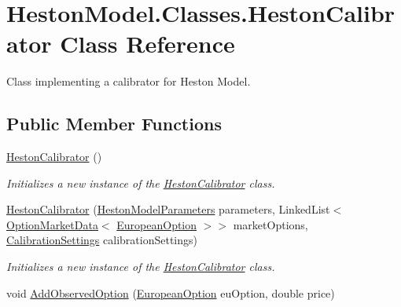 \hypertarget{class_heston_model_1_1_classes_1_1_heston_calibrator}{}\section{Heston\+Model.\+Classes.\+Heston\+Calibrator Class Reference}
\label{class_heston_model_1_1_classes_1_1_heston_calibrator}


Class implementing a calibrator for Heston Model.  


\subsection*{Public Member Functions}
\begin{DoxyCompactItemize}
\item 
\mbox{\hyperlink{class_heston_model_1_1_classes_1_1_heston_calibrator_af0e3e9c779449c4e1631e84879f06459}{Heston\+Calibrator}} ()
\begin{DoxyCompactList}\small\item\em Initializes a new instance of the \mbox{\hyperlink{class_heston_model_1_1_classes_1_1_heston_calibrator}{Heston\+Calibrator}} class. \end{DoxyCompactList}\item 
\mbox{\hyperlink{class_heston_model_1_1_classes_1_1_heston_calibrator_a29fda277662e02cf344c6fbb2814c4df}{Heston\+Calibrator}} (\mbox{\hyperlink{class_heston_model_1_1_classes_1_1_interface_classes_1_1_heston_model_parameters}{Heston\+Model\+Parameters}} parameters, Linked\+List$<$ \mbox{\hyperlink{class_heston_model_1_1_classes_1_1_interface_classes_1_1_option_market_data}{Option\+Market\+Data}}$<$ \mbox{\hyperlink{class_heston_model_1_1_classes_1_1_interface_classes_1_1_european_option}{European\+Option}} $>$$>$ market\+Options, \mbox{\hyperlink{class_heston_model_1_1_classes_1_1_interface_classes_1_1_calibration_settings}{Calibration\+Settings}} calibration\+Settings)
\begin{DoxyCompactList}\small\item\em Initializes a new instance of the \mbox{\hyperlink{class_heston_model_1_1_classes_1_1_heston_calibrator}{Heston\+Calibrator}} class. \end{DoxyCompactList}\item 
void \mbox{\hyperlink{class_heston_model_1_1_classes_1_1_heston_calibrator_af01c864f0fe8c4ea07569c53913b173e}{Add\+Observed\+Option}} (\mbox{\hyperlink{class_heston_model_1_1_classes_1_1_interface_classes_1_1_european_option}{European\+Option}} eu\+Option, double price)
$$
\end{DoxyCompactItemize}
